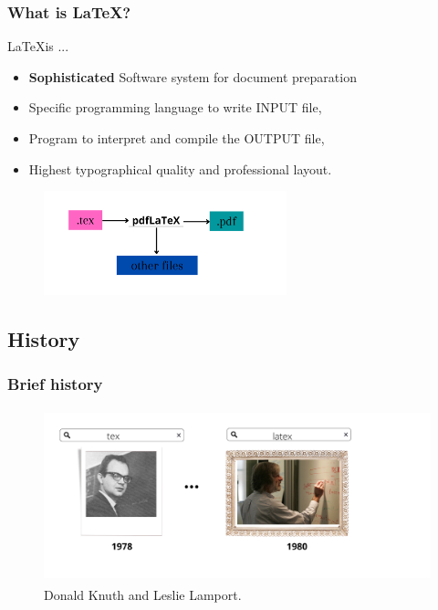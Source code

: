 \documentclass{beamer}
\begin{document}
\begin{frame}
	\frametitle<presentation>{What is \LaTeX?}
	\begin{block}{\LaTeX is ...}
	\begin{itemize}
	    \item \textbf{Sophisticated} Software system for document preparation
	    \item Specific programming language to write INPUT file,
	    \item Program to interpret and compile the OUTPUT file,
	    \item Highest typographical quality and professional layout.
	\end{itemize}
		\begin{figure}
		\centering
			\includegraphics[height=3cm]{tex.png}
		\label{fig:texfile}
	\end{figure}
 	\end{block}
\end{frame}

\subsection{History}
\begin{frame}
	\frametitle<presentation>{Brief history}
	\begin{figure}
		\centering
			\includegraphics[height=5cm]{figures/texcreators.png}
		\caption{Donald Knuth and Leslie Lamport.}
		\label{fig:creators}
	\end{figure}
\end{frame}
\subsection*{}
\end{document}

